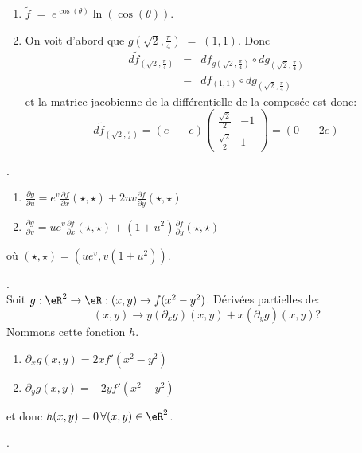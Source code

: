 \begin{enumerate}
\item $\tilde{f} \;=\;e^{\cos(\theta)}\ln(\cos(\theta))$.
\item On voit d'abord que $g(\sqrt2, \frac{\pi}{4})\;=\;(1,1)$. Donc
    \[\begin{array}{cccc} d\tilde{f}_{(\sqrt2, \frac{\pi}{4})} & = & df_{g(\sqrt2, \frac{\pi}{4})}\circ dg_{(\sqrt2, \frac{\pi}{4})}\\
        & =& df_{(1,1)}\circ dg_{(\sqrt2, \frac{\pi}{4})} \end{array}\]
                                et  la matrice jacobienne de la différentielle de la composée est donc:\[d\tilde{f}_{(\sqrt2, \frac{\pi}{4})}=(e\;\;-e)\left(\begin{array}{cc} \frac{\sqrt2}{2} & -1\\
                                    \frac{\sqrt2}{2}&1\end{array}\right)=(0\;\;-2e)\]



\end{enumerate}


.
\begin{enumerate}
    \item $\frac{ \partial g }{ \partial u } = e^v\frac{ \partial f }{ \partial x }(\star,\star)+2uv\frac{ \partial f }{ \partial y }(\star,\star)$
    \item $\frac{ \partial g }{ \partial v } = ue^v\frac{ \partial f }{ \partial x }(\star,\star)+(1+u^2)\frac{ \partial f }{ \partial y }(\star,\star)$
\end{enumerate}
où $(\star,\star) = (ue^v,v(1+u^2))$.

\vspace{1cm}

. \\

\noindent Soit $g:\eR^2\rightarrow \eR:(x,y)\rightarrow  f(x^2-y^2)$. Dérivées partielles de:\[(x,y)\rightarrow  y(\partial_xg)(x,y)+x(\partial_yg)(x,y)?\]
Nommons cette fonction $h$.
\begin{enumerate}
\item $\partial_xg(x,y) = 2xf'(x^2-y^2)$
\item$\partial_yg(x,y) = -2yf'(x^2-y^2)$
\end{enumerate}
et donc $h(x,y) = 0 \, \forall (x,y)\in \eR^2$.

\vspace{1cm}


. \\

